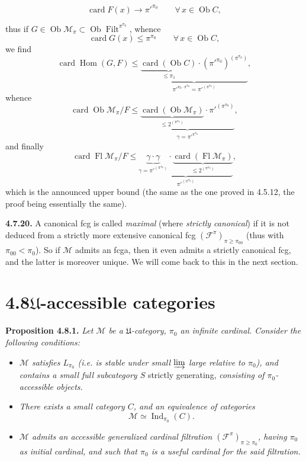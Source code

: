 \documentclass[11pt]{article}
\newcommand{\printedpage}[1]{\marginpar{\footnotesize p.~#1}}
\newcommand{\msp}[1]{\marginpar{\footnotesize [#1]}}
\newcommand{\Ob}{\operatorname{Ob}}
\newcommand{\Fl}{\operatorname{Fl}}
\newcommand{\card}{\operatorname{card}}
\newcommand{\Hom}{\operatorname{Hom}}
\newcommand{\Filt}{\operatorname{Filt}}
\newcommand{\Ind}{\operatorname{Ind}}
\begin{document}
\printedpage{64}

\msp{page 186}

\[ \card F(x) \longrightarrow \pi'^{\pi_0} \qquad \forall\, x \in \Ob C , \] %

thus if $G \in \Ob \mathcal{M}_\pi \subset \Ob \Filt^{\pi^{\pi_0}}$, whence
\[ \card G(x) \leqslant \pi^{\pi_0} \qquad \forall\, x \in \Ob C , \]
we find
\[ \card \Hom(G,F) \leqslant \underbrace{\underbrace{\card(\Ob C)}_{\leqslant \pi_1}\cdot(\pi'^{\pi_0})^{(\pi^{\pi_0})}}_{\pi'^{\pi_0\cdot\pi^{\pi_0}} = \pi'^{(\pi^{\pi_0})}} , \]
whence
\[ \card \Ob \mathcal{M}_\pi/F \leqslant \underbrace{\underbrace{\card(\Ob \mathcal{M}_\pi)}_{\leqslant 2^{(\pi^{\pi_0})}}\cdot\pi'^{(\pi^{\pi_0})}}_{\gamma = \pi'^{\pi^{\pi_0}}} , \]
and finally
\[ \card \Fl \mathcal{M}_\pi/F \leqslant \underbrace{\underbrace{\gamma\cdot\gamma}_{\gamma = \pi'^{(\pi^{\pi_0})}}\cdot\underbrace{\card(\Fl \mathcal{M}_\pi)}_{\leqslant 2^{(\pi^{\pi_0})}}}_{\pi'^{(\pi^{\pi_0})}} , \]
which is the announced upper bound (the same as the one proved in 4.5.12, the proof being essentially the same).

\msp{page 187}

\textbf{4.7.20.} A canonical fcg is called \textit{maximal} (where \textit{strictly canonical}) if it is not deduced from a strictly more extensive canonical fcg $(\mathcal{F}^\pi)_{\pi\geqslant\pi_{00}}$ (thus with $\pi_{00} < \pi_0$). So if $\mathcal{M}$ admits an fcga, then it even admits a strictly canonical fcg, and the latter is moreover unique. We will come back to this in the next section. %

\section*{4.8\quad $\mathfrak{U}$-accessible categories}

\textbf{Proposition 4.8.1.} \textit{Let $\mathcal{M}$ be a $\mathfrak{U}$-category, $\pi_0$ an infinite cardinal. Consider the following conditions:}
\begin{itemize}[label={}]
\item[\textit{a)}] \textit{$\mathcal{M}$ satisfies $L_{\pi_0}$ (i.e. is stable under small $\varinjlim$ large relative to $\pi_0$), and contains a small full subcategory $S$} strictly generating, \textit{consisting of $\pi_0$-accessible objects.}
\item[\textit{b)}] \textit{There exists a small category $C$, and an equivalence of categories}
\[ \mathcal{M} \simeq \Ind_{\pi_0}(C) . \]
\item[\textit{c)}] \textit{$\mathcal{M}$ admits an accessible generalized cardinal filtration $(\mathcal{F}^\pi)_{\pi\geqslant\pi_0}$, having $\pi_0$ as initial cardinal, and such that $\pi_0$ is a useful cardinal for the said filtration.}
\end{itemize}
\end{document}
